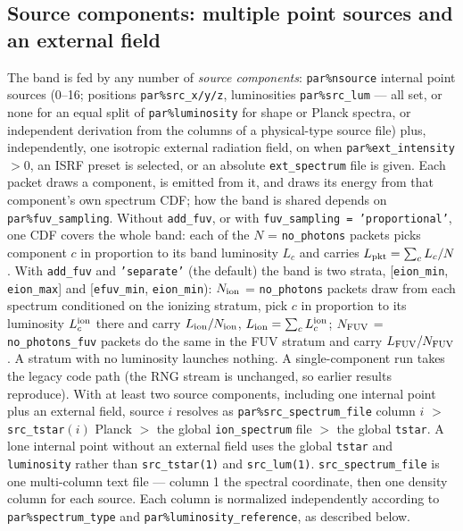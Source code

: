 \documentclass[english,a4paper]{my_memo}
\newcommand{\code}[1]{\texttt{#1}}
\begin{document}
\subsection{Source components: multiple point sources and an external
field}
\label{sec:sources}
The band is fed by any number of \emph{source components}:
\code{par\%nsource} internal point sources (0--16; positions
\code{par\%src\_x/y/z}, luminosities \code{par\%src\_lum} ---
all set, or none for an equal split of \code{par\%luminosity} for
shape or Planck spectra, or independent derivation from the columns
of a physical-type source file) plus, independently, one isotropic
external radiation field, on when \code{par\%ext\_intensity} $> 0$,
an ISRF preset is selected, or an absolute \code{ext\_spectrum} file
is given.  Each packet draws a component, is emitted from it, and
draws its energy from that component's own spectrum CDF; how the band
is shared depends on \code{par\%fuv\_sampling}.  Without
\code{add\_fuv}, or with \code{fuv\_sampling = 'proportional'}, one
CDF covers the whole band: each of the $N$ = \code{no\_photons}
packets picks component $c$ in proportion to its band luminosity $L_c$
and carries $L_{\rm pkt} = \sum_c L_c/N$.  With \code{add\_fuv} and
\code{'separate'} (the default) the band is two strata,
[\code{eion\_min}, \code{eion\_max}] and [\code{efuv\_min},
\code{eion\_min}): $N_{\rm ion}$ = \code{no\_photons} packets draw
from each spectrum conditioned on the ionizing stratum, pick $c$ in
proportion to its luminosity $L_c^{\rm ion}$ there and carry
$L_{\rm ion}/N_{\rm ion}$, $L_{\rm ion} = \sum_c L_c^{\rm ion}$;
$N_{\rm FUV}$ = \code{no\_photons\_fuv} packets do the same in the FUV
stratum and carry $L_{\rm FUV}/N_{\rm FUV}$.  A stratum with no
luminosity launches nothing.  A single-component
run takes the legacy code path (the RNG stream is unchanged, so earlier
results reproduce).  With at least two source components, including
one internal point plus an external field, source $i$ resolves
as \code{par\%src\_spectrum\_file} column $i$ $>$
\code{src\_tstar}$(i)$ Planck $>$ the global \code{ion\_spectrum}
file $>$ the global \code{tstar}.  A lone internal point without an
external field uses the global \code{tstar} and \code{luminosity}
rather than \code{src\_tstar(1)} and \code{src\_lum(1)}.
\code{src\_spectrum\_file} is one multi-column text file
--- column 1 the spectral coordinate, then one density column for
each source.  Each column is normalized independently according to
\code{par\%spectrum\_type} and \code{par\%luminosity\_reference},
as described below.
\end{document}
